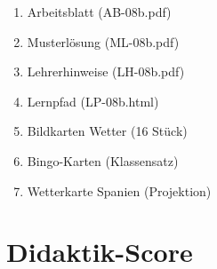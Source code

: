\documentclass[11pt,a4paper]{article}
\begin{document}
\begin{enumerate}
    \item Arbeitsblatt (AB-08b.pdf)
    \item Musterlösung (ML-08b.pdf)
    \item Lehrerhinweise (LH-08b.pdf)
    \item Lernpfad (LP-08b.html)
    \item Bildkarten Wetter (16 Stück)
    \item Bingo-Karten (Klassensatz)
    \item Wetterkarte Spanien (Projektion)
\end{enumerate}

\newpage
\section{Didaktik-Score}
\end{document}
